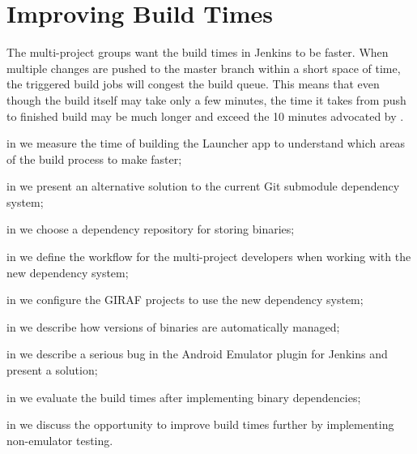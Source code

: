 \chapter{Improving Build Times}
The multi-project groups want the build times in Jenkins to be faster. When multiple changes are pushed to the master branch within a short space of time, the triggered build jobs will congest the build queue. This means that even though the build itself may take only a few minutes, the time it takes from push to finished build may be much longer and exceed the 10 minutes advocated by \textcite{beck2004}.

\begin{chapterorganization}
  \item in  we measure the time of building the Launcher app to understand which areas of the build process to make faster;
  \item in  we present an alternative solution to the current Git submodule dependency system;
  \item in  we choose a dependency repository for storing binaries;
  \item in  we define the workflow for the multi-project developers when working with the new dependency system;
  \item in  we configure the GIRAF projects to use the new dependency system;
  \item in  we describe how versions of binaries are automatically managed;
  \item in  we describe a serious bug in the Android Emulator plugin for Jenkins and present a solution;
  \item in  we evaluate the build times after implementing binary dependencies;
  \item in  we discuss the opportunity to improve build times further by implementing non-emulator testing.
\end{chapterorganization}

